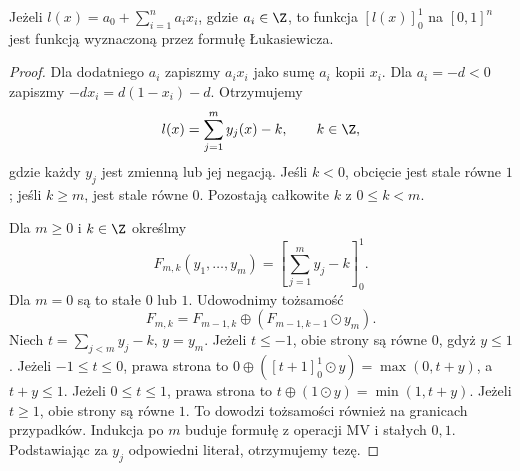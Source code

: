 \begin{lemat}\label{lem:lst-fuzzy-clipped-affine}
Jeżeli $l(x)=a_0+\sum_{i=1}^n a_ix_i$, gdzie $a_i\in\Z$, to
funkcja $[l(x)]_0^1$ na $[0,1]^n$ jest funkcją wyznaczoną przez
formułę Łukasiewicza.
\end{lemat}
\begin{proof}
Dla dodatniego $a_i$ zapiszmy $a_ix_i$ jako sumę $a_i$ kopii
$x_i$. Dla $a_i=-d<0$ zapiszmy $-dx_i=d(1-x_i)-d$.
Otrzymujemy
\[
 l(x)=\sum_{j=1}^m y_j(x)-k,\qquad k\in\Z,
\]
gdzie każdy $y_j$ jest zmienną lub jej negacją. Jeśli $k<0$,
obcięcie jest stale równe $1$; jeśli $k\geq m$, jest stale
równe $0$. Pozostają całkowite $k$ z $0\leq k<m$.

Dla $m\geq0$ i $k\in\Z$ określmy
\[
 F_{m,k}(y_1,\ldots,y_m)=
 \left[\sum_{j=1}^m y_j-k\right]_0^1.
\]
Dla $m=0$ są to stałe $0$ lub $1$. Udowodnimy tożsamość
\begin{equation}\label{eq:lst-fuzzy-clipped-recurrence}
 F_{m,k}=F_{m-1,k}\oplus(F_{m-1,k-1}\odot y_m).
\end{equation}
Niech $t=\sum_{j<m} y_j-k$, $y=y_m$.
Jeżeli $t\leq-1$, obie strony są równe $0$, gdyż $y\leq1$.
Jeżeli $-1\leq t\leq0$, prawa strona to
$0\oplus([t+1]_0^1\odot y)=\max(0,t+y)$,
a $t+y\leq1$. Jeżeli $0\leq t\leq1$, prawa strona to
$t\oplus(1\odot y)=\min(1,t+y)$.
Jeżeli $t\geq1$, obie strony są równe $1$.
To dowodzi tożsamości również na granicach przypadków.
Indukcja po $m$ buduje formułę z operacji MV i stałych $0,1$.
Podstawiając za $y_j$ odpowiedni literał, otrzymujemy tezę.
\end{proof}

